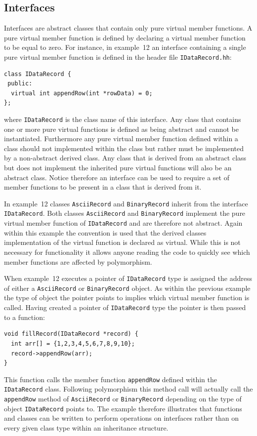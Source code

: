 \documentclass[11pt,a4paper]{scrartcl}
\begin{document}

\subsection{Interfaces}
Interfaces are abstract classes that contain only pure virtual
member functions.  A pure virtual member function is defined by
declaring a virtual member function to be equal to zero.  For instance,
in example~12 an interface containing a single pure virtual member function is
defined in the header file \texttt{IDataRecord.hh}:
%
\begin{verbatim}
class IDataRecord {
 public:
  virtual int appendRow(int *rowData) = 0;
};
\end{verbatim}
%
where \texttt{IDataRecord} is the class name of this interface.  Any
class that contains one or more pure virtual functions is defined as
being abstract and cannot be instantiated.  Furthermore any pure
virtual member function defined within a class should not implemented
within the class but rather must be implemented by a non-abstract
derived class.  Any class that is derived from an abstract class but
does not implement the inherited pure virtual functions will also be
an abstract class.  Notice therefore an interface can be used to
require a set of member functions to be present in a class that is
derived from it.

In example~12 classes \texttt{AsciiRecord} and \texttt{BinaryRecord}
inherit from the interface \texttt{IDataRecord}.  Both classes
\texttt{AsciiRecord} and \texttt{BinaryRecord} implement the pure
virtual member function of \texttt{IDataRecord} and are therefore not
abstract.  Again within this example the convention is used that the
derived classes implementation of the virtual function is declared as
virtual.  While this is not necessary for functionality it allows
anyone reading the code to quickly see which member functions are affected
by polymorphism.

When example~12 executes a pointer of \texttt{IDataRecord} type is
assigned the address of either a \texttt{AsciiRecord} or
\texttt{BinaryRecord} object.  As within the previous example the type
of object the pointer points to implies which virtual member function is
called.  Having created a pointer of \texttt{IDataRecord} type the
pointer is then passed to a function:
%
\begin{verbatim}
void fillRecord(IDataRecord *record) {
  int arr[] = {1,2,3,4,5,6,7,8,9,10};
  record->appendRow(arr);
}
\end{verbatim}
%
This function calls the member function \texttt{appendRow} defined within the
\texttt{IDataRecord} class.  Following polymorphism this method call
will actually call the \texttt{appendRow} method of \texttt{AsciiRecord} or
\texttt{BinaryRecord} depending on the type of object
\texttt{IDataRecord} points to.  The example therefore illustrates
that functions and classes can be written to perform operations on
interfaces rather than on every given class type within an inheritance
structure.
\end{document}
